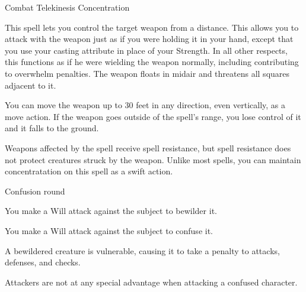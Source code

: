 \begin{spellsection}{Combat Telekinesis}
    \spelldur Concentration
    \begin{spelleffect}
        This spell lets you control the target weapon from a distance. This allows you to attack with the weapon just as if you were holding it in your hand, except that you use your casting attribute in place of your Strength. In all other respects, this functions as if he were wielding the weapon normally, including contributing to overwhelm penalties. The weapon floats in midair and threatens all squares adjacent to it.

        You can move the weapon up to 30 feet in any direction, even vertically, as a move action. If the weapon goes outside of the spell's range, you lose control of it and it falls to the ground.
    \end{spelleffect}
    \begin{spellnotes}
        Weapons affected by the spell receive spell resistance, but spell resistance does not protect creatures struck by the weapon. Unlike most spells, you can maintain concentratation on this spell as a swift action.
    \end{spellnotes}
\end{spellsection}

\begin{spellsection}[Lesser]{Confusion}
     round
    \begin{spellhealthy}
        You make a Will attack against the subject to bewilder it.
    \end{spellhealthy}
    \begin{spellblood}
        You make a Will attack against the subject to confuse it. \confusionexplanation
    \end{spellblood}
    \begin{spellnotes}
        A bewildered creature is vulnerable, causing it to take a  penalty to attacks, defenses, and checks.
        \par Attackers are not at any special advantage when attacking a confused character.
    \end{spellnotes}
\end{spellsection}


